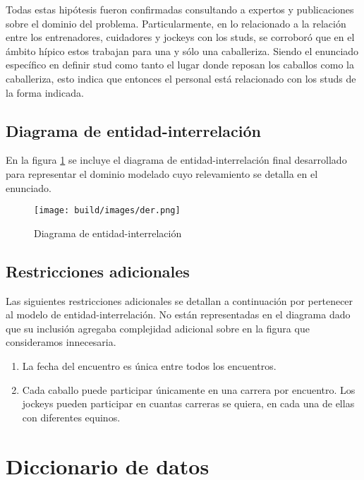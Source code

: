 \documentclass[a4paper,11pt]{article}
\begin{document}
Todas estas hipótesis fueron confirmadas consultando a expertos y publicaciones
sobre el dominio del problema. Particularmente, en lo relacionado a la relación
entre los entrenadores, cuidadores y jockeys con los studs, se corroboró que en
el ámbito hípico estos trabajan para una y sólo una caballeriza. Siendo el
enunciado específico en definir stud como tanto el lugar donde reposan los
caballos como la caballeriza, esto indica que entonces el personal está
relacionado con los studs de la forma indicada.

\subsection{Diagrama de entidad-interrelación}

En la figura \ref{fig:der} se incluye el diagrama de entidad-interrelación
final desarrollado para representar el dominio modelado cuyo relevamiento se
detalla en el enunciado.

\begin{figure}[h!t]
  \centering
\texttt{[image: build/images/der.png]}
  \caption{Diagrama de entidad-interrelación} \label{fig:der}
\end{figure}

\FloatBarrier

\subsection{Restricciones adicionales}

Las siguientes restricciones adicionales se detallan a continuación por
pertenecer al modelo de entidad-interrelación. No están representadas en el
diagrama dado que su inclusión agregaba complejidad adicional sobre en la
figura que consideramos innecesaria.

\begin{enumerate}

  \item La fecha del encuentro es única entre todos los encuentros.

  \item Cada caballo puede participar únicamente en una carrera por encuentro.
    Los jockeys pueden participar en cuantas carreras se quiera, en cada una de
    ellas con diferentes equinos.

\end{enumerate}

\section{Diccionario de datos}
\end{document}

